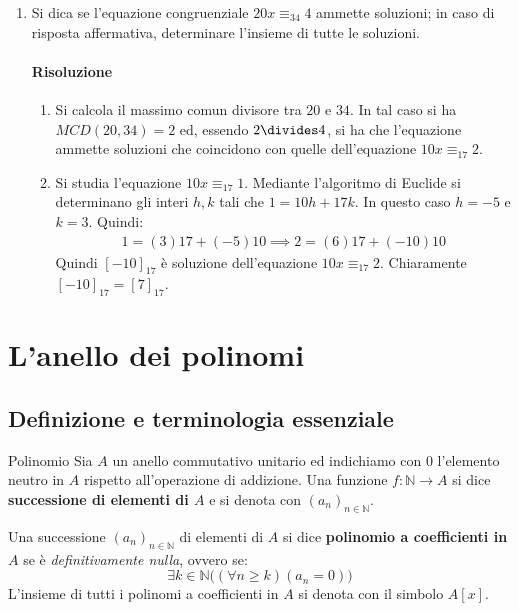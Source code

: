 \begin{example}
\begin{enumerate}
	\item Si dica se l'equazione congruenziale $20x \equiv_{34} 4$ ammette soluzioni; in caso di risposta affermativa, determinare l'insieme di tutte le soluzioni.
	
	\paragraph{Risoluzione}
	\begin{enumerate}
		\item Si calcola il massimo comun divisore tra $20$ e $34$. In tal caso si ha $MCD(20,34)=2$ ed, essendo $2 \divides 4$, si ha che l'equazione ammette soluzioni che coincidono con quelle dell'equazione $10x \equiv_{17} 2$.
		\item Si studia l'equazione $10x \equiv_{17} 1$. Mediante l'algoritmo di Euclide si determinano gli interi $h,k$ tali che $1=10h+17k$. In questo caso $h=-5$ e $k=3$. Quindi:
		\begin{align*}
			1 = (3)17 +(-5)10 \implies 2 = (6)17 + (-10)10
		\end{align*}
	Quindi $[-10]_{17}$ è soluzione dell'equazione $10x \equiv_{17} 2$. Chiaramente $[-10]_{17}=[7]_{17}$.
	\end{enumerate}
\end{enumerate}
\end{example}

\section{L'anello dei polinomi}

\subsection{Definizione e terminologia essenziale}

\begin{defbox}{Polinomio}
	Sia $A$ un anello commutativo unitario ed indichiamo con $0$ l'elemento neutro in $A$ rispetto all'operazione di addizione. Una funzione $f : \mathbb{N} \rightarrow A$ si dice \textbf{successione di elementi di $A$} e si denota con $(a_{n})_{n \in \mathbb{N}}$.
	\bigskip
	
	Una successione $(a_{n})_{n \in \mathbb{N}}$ di elementi di $A$ si dice \textbf{polinomio a coefficienti in $A$} se è \emph{definitivamente nulla}, ovvero se:
	\begin{equation}
		\exists k \in \mathbb{N} \bigl( (\forall n \geq k) (a_{n}=0)\bigr)
	\end{equation}
	L'insieme di tutti i polinomi a coefficienti in $A$ si denota con il simbolo $A[x]$.
\end{defbox}

